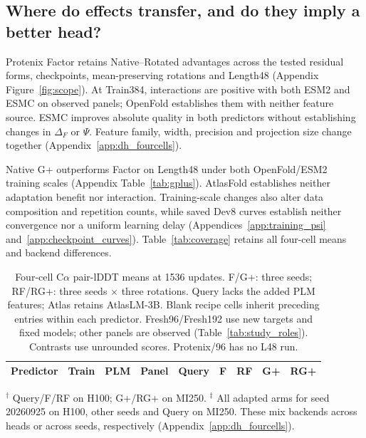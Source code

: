 \subsection{Where do effects transfer, and do they imply a better head?}
\label{sec:esmc}
\label{sec:protenix}
\label{sec:length}
Protenix Factor retains Native--Rotated advantages across the tested
residual forms, checkpoints, mean-preserving rotations and Length48
(Appendix Figure~\ref{fig:scope}). At Train384, interactions are positive
with both ESM2 and ESMC on observed panels; OpenFold establishes them with
neither feature source. ESMC improves absolute quality in both predictors
without establishing changes in $\Delta_F$ or $\Psi$. Feature family,
width, precision and projection size change together
(Appendix~\ref{app:dh_fourcells}).

\label{sec:limits_results}
Native G+ outperforms Factor on Length48 under both OpenFold/ESM2 training
scales (Appendix Table~\ref{tab:gplus}). AtlasFold establishes neither
adaptation benefit nor interaction. Training-scale changes also alter data
composition and repetition counts, while saved Dev8 curves establish neither
convergence nor a uniform learning delay
(Appendices~\ref{app:training_psi} and~\ref{app:checkpoint_curves}).
Table~\ref{tab:coverage} retains all four-cell means and backend differences.

\begin{table}[t]
\caption{Four-cell C$\alpha$ pair-lDDT means at 1536 updates. F/G+: three seeds;
RF/RG+: three seeds $\times$ three rotations. Query lacks the added PLM features;
Atlas retains AtlasLM-3B. Blank recipe cells inherit preceding entries within
each predictor. Fresh96/Fresh192 use new targets and fixed models; other panels are
observed (Table~\ref{tab:study_roles}). Contrasts use unrounded scores.
Protenix/96 has no L48 run.}
\label{tab:coverage}\label{tab:esmc}\centering\footnotesize
\setlength{\tabcolsep}{5pt}
\begin{tabular}{@{}llllrrrrr@{}}\toprule
Predictor & Train & PLM & Panel & Query & F & RF & G+ & RG+ \\\midrule

\end{tabular}
\par\smallskip\raggedright\footnotesize
$^\dagger$ Query/F/RF on H100; G+/RG+ on MI250.
$^\ddagger$ All adapted arms for seed 20260925 on H100, other seeds and Query
on MI250. These mix backends across heads or across seeds, respectively
(Appendix~\ref{app:dh_fourcells}).
\end{table}


